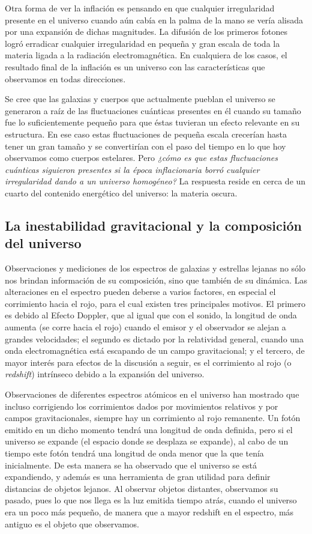 Otra forma de ver la inflación es pensando en que cualquier irregularidad presente en el universo cuando aún cabía en la palma de la mano se vería alisada por una expansión de dichas magnitudes. La difusión de los primeros fotones logró erradicar cualquier irregularidad en pequeña y gran escala de toda la materia ligada a la radiación electromagnética\cite{loeb}. En cualquiera de los casos, el resultado final de la inflación es un universo con las características que observamos en todas direcciones. 

Se cree que las galaxias y cuerpos que actualmente pueblan el universo se generaron a raíz  de las fluctuaciones cuánticas presentes en él cuando su tamaño fue lo suficientemente pequeño para que éstas tuvieran un efecto relevante en su estructura. En ese caso estas fluctuaciones de pequeña escala crecerían hasta tener un gran tamaño y se convertirían con el paso del tiempo en lo que hoy observamos como cuerpos estelares. Pero \textit{¿cómo es que estas fluctuaciones cuánticas siguieron presentes si la época inflacionaria borró cualquier irregularidad dando a un universo homogéneo?} La respuesta reside en cerca de un cuarto del contenido energético del universo: la materia oscura. 

\subsection{La inestabilidad gravitacional y la composición del universo}
\label{sub:grav}
Observaciones y mediciones de los espectros de galaxias y estrellas lejanas no sólo nos brindan información de su composición, sino que también de su dinámica. Las alteraciones en el espectro pueden deberse a varios factores, en especial el corrimiento hacia el rojo, para el cual existen tres principales motivos. El primero es debido al Efecto Doppler, que al igual que con el sonido, la longitud de onda aumenta (se corre hacia el rojo) cuando el emisor y el observador se alejan a grandes velocidades; el segundo es dictado por la relatividad general, cuando una onda electromagnética está escapando de un campo gravitacional; y el tercero, de mayor interés para efectos de la discusión a seguir, es el corrimiento al rojo (o \textit{redshift}) intrínseco debido a la expansión del universo. 

Observaciones de diferentes espectros atómicos en el universo han mostrado que incluso corrigiendo los corrimientos dados por movimientos relativos y por campos gravitacionales, siempre hay un corrimiento al rojo remanente. Un fotón emitido en un dicho momento tendrá una longitud de onda definida, pero si el universo se expande (el espacio donde se desplaza se expande), al cabo de un tiempo este fotón tendrá una longitud de onda menor que la que tenía inicialmente. De esta manera se ha observado que el universo se está expandiendo, y además es una herramienta de gran utilidad para definir distancias de objetos lejanos. Al observar objetos distantes, observamos su pasado, pues lo que nos llega es la luz emitida tiempo atrás, cuando el universo era un poco más pequeño, de manera que a mayor redshift en el espectro, más antiguo es el objeto que observamos.

